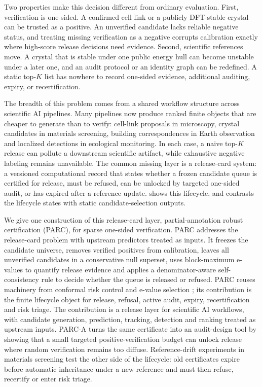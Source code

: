 \documentclass[10pt,twocolumn]{article}
\begin{document}
Two properties make this decision different from ordinary evaluation.
First, verification is one-sided.
A confirmed cell link or a publicly DFT-stable crystal can be trusted as a positive.
An unverified candidate lacks reliable negative status, and treating missing verification as a negative corrupts calibration exactly where high-score release decisions need evidence.
Second, scientific references move.
A crystal that is stable under one public energy hull can become unstable under a later one, and an audit protocol or an identity graph can be redefined.
A static top-\(K\) list has nowhere to record one-sided evidence, additional auditing, expiry, or recertification.

The breadth of this problem comes from a shared workflow structure across scientific AI pipelines.
Many pipelines now produce ranked finite objects that are cheaper to generate than to verify: cell-link proposals in microscopy, crystal candidates in materials screening, building correspondences in Earth observation and localized detections in ecological monitoring.
In each case, a naive top-\(K\) release can pollute a downstream scientific artifact, while exhaustive negative labeling remains unavailable.
The common missing layer is a release-card system: a versioned computational record that states whether a frozen candidate queue is certified for release, must be refused, can be unlocked by targeted one-sided audit, or has expired after a reference update.
 shows this lifecycle, and  contrasts the lifecycle states with static candidate-selection outputs.

We give one construction of this release-card layer, partial-annotation robust certification (PARC), for sparse one-sided verification.
PARC addresses the release-card problem with upstream predictors treated as inputs.
It freezes the candidate universe, removes verified positives from calibration, leaves all unverified candidates in a conservative null superset, uses block-maximum e-values to quantify release evidence and applies a denominator-aware self-consistency rule to decide whether the queue is released or refused.
PARC reuses machinery from conformal risk control and e-value selection \cite{vovk2005algorithmic,bates2021distribution,wang2022false,ramdas2023game}; its contribution is the finite lifecycle object for release, refusal, active audit, expiry, recertification and risk triage.
The contribution is a release layer for scientific AI workflows, with candidate generation, prediction, tracking, detection and ranking treated as upstream inputs.
PARC-A turns the same certificate into an audit-design tool by showing that a small targeted positive-verification budget can unlock release where random verification remains too diffuse.
Reference-drift experiments in materials screening test the other side of the lifecycle: old certificates expire before automatic inheritance under a new reference and must then refuse, recertify or enter risk triage.
\end{document}
